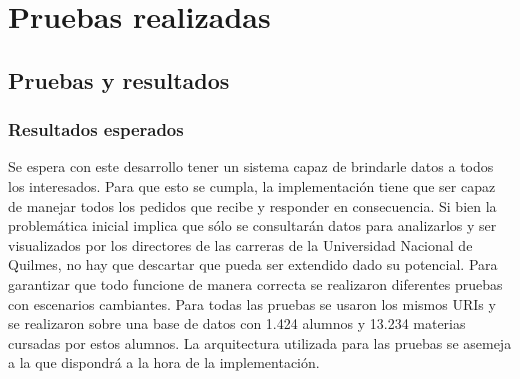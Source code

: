 \chapter{Pruebas realizadas}
\label{sec:implementacion}

\section[Pruebas y resultados]{Pruebas y resultados}

\subsection[Resultados esperados]{Resultados esperados}

Se espera con este desarrollo tener un sistema capaz de brindarle datos a todos los interesados. Para que esto se cumpla, la implementación tiene que ser capaz de manejar todos los pedidos que recibe y responder en consecuencia. 
Si bien la problemática inicial implica que sólo se consultarán datos para analizarlos y ser visualizados por los directores de las carreras de la Universidad Nacional de Quilmes, no hay que descartar que pueda ser extendido dado su potencial.
Para garantizar que todo funcione de manera correcta se realizaron diferentes pruebas con escenarios cambiantes.
Para todas las pruebas se usaron los mismos URIs y se realizaron sobre una base de datos con 1.424 alumnos y 13.234 materias cursadas por estos alumnos.
La arquitectura utilizada para las pruebas se asemeja a la que dispondrá a la hora de la implementación.


\break
